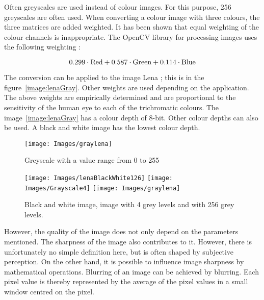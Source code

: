 Often greyscales are used instead of colour images. For this purpose, 256 greyscales are often used.%
When converting a colour image with three colours, the three matrices are added weighted. It has been shown that equal weighting of the colour channels is inappropriate. The OpenCV library for processing images uses the following weighting \cite{OpenCV:2020b}:

$$0.299 \cdot \hbox{Red} +0.587 \cdot \hbox{Green} +0.114 \cdot \hbox{Blue}$$

The conversion can be applied to the image \glqq Lena \grqq{}; this is in the figure~\ref{image:lenaGray}. Other weights are used depending on the application. 
The above weights are empirically determined and are proportional to the sensitivity of the human eye to each of the trichromatic colours. The image~\ref{image:lenaGray} has a colour depth of 8-bit. Other colour depths can also be used. A black and white image has the lowest colour depth. 

\begin{figure}[!h]
	\begin{center}
		
		\texttt{[image: Images/graylena]}
		
		\caption{Greyscale with a value range from 0 to 255}\label{Bild:lenaGray}
	\end{center}    
\end{figure}




\begin{figure}[!h]
	\begin{center}
		
		
		\texttt{[image: Images/lenaBlackWhite126]}
		\quad
		\texttt{[image: Images/Grayscale4]}
		\quad
		\texttt{[image: Images/graylena]}
		
		\caption{Black and white image, image with 4 grey levels and with 256 grey levels.}\label{Bild:}
	\end{center}    
\end{figure}


However, the quality of the image does not only depend on the parameters mentioned. The sharpness of the image also contributes to it. However, there is unfortunately no simple definition here, but is often shaped by subjective perception. On the other hand, it is possible to influence image sharpness by mathematical operations.  Blurring of an image can be achieved by blurring. 
Each pixel value is thereby represented by the average of the pixel values in a small window centred on the pixel. 

